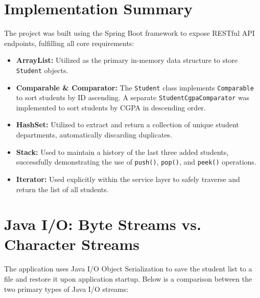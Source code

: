 \documentclass[12pt, a4paper]{article}
\begin{document}
    \section*{Implementation Summary}                                                                                                                                      
    The project was built using the Spring Boot framework to expose RESTful API endpoints, fulfilling all core requirements:                                               
    \begin{itemize}                                                                                                                                                        
        \item \textbf{ArrayList:} Utilized as the primary in-memory data structure to store \texttt{Student} objects.                                                      
        \item \textbf{Comparable \& Comparator:} The \texttt{Student} class implements \texttt{Comparable} to sort students by ID ascending. A separate                    
  \texttt{StudentCgpaComparator} was implemented to sort students by CGPA in descending order.                                                                             
        \item \textbf{HashSet:} Utilized to extract and return a collection of unique student departments, automatically discarding duplicates.                            
        \item \textbf{Stack:} Used to maintain a history of the last three added students, successfully demonstrating the use of \texttt{push()}, \texttt{pop()}, and      
  \texttt{peek()} operations.                                                                                                                                              
        \item \textbf{Iterator:} Used explicitly within the service layer to safely traverse and return the list of all students.                                          
    \end{itemize}                                                                                                                                                          
                                                                                                                                                                           
    \section*{Java I/O: Byte Streams vs. Character Streams}                                                                                                                
    The application uses Java I/O Object Serialization to save the student list to a file and restore it upon application     
  startup. Below is a comparison between the two primary types of Java I/O streams:                                                                                        
                                                                                                                                                                           
\end{document}
